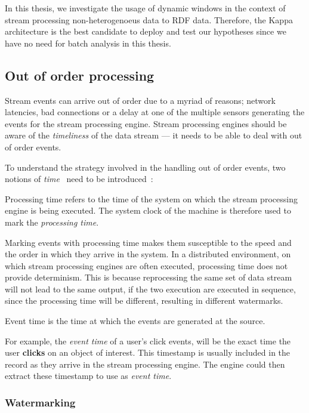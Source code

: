 In this thesis, we investigate the usage of dynamic windows in the context of stream processing 
non-heterogenoeus data to RDF data. 
Therefore, the Kappa architecture is the best candidate to deploy and test our 
hypotheses since we have no need for batch analysis in this thesis.  

\subsection{Out of order processing}%
\label{sub:Out of order processing}
Stream events can arrive out of order due to a myriad of reasons; network latencies, 
bad connections or a delay at one of the multiple sensors generating the events for 
the stream processing engine. Stream 
processing engines should be aware of the \emph{timeliness} of the data stream --- it needs 
to be able to deal with out of order events. 

To understand the strategy involved in the handling out of order events, 
two notions of \emph{time}~ need to be introduced~\cite{watermark_flink}:  

\begin{defn}
    Processing time refers to the time of the system on which the stream processing 
    engine is being executed. The system clock of the machine is therefore used 
    to mark the \emph{processing time}. 
\end{defn}
Marking events with processing time makes them 
susceptible to the speed and the order in which they arrive in the system. 
In a distributed environment, on which stream processing engines are often 
executed, processing time does not provide determinism. This is because 
reprocessing the same set of data stream will not lead to the same output, if 
the two execution are executed in sequence, since the processing time will be 
different, resulting in different watermarks. 


\begin{defn}
    Event time is the time at which the events are generated at the source.
\end{defn}
For example, the \emph{event time} of a user's click events,
will be the exact time the user \textbf{clicks} on an object of 
interest. This timestamp is usually included in the record as they arrive 
in the stream processing engine. The engine could then extract these 
timestamp to use as \emph{event time}. 


\subsubsection{Watermarking}%
\label{ssub:Watermarking}

